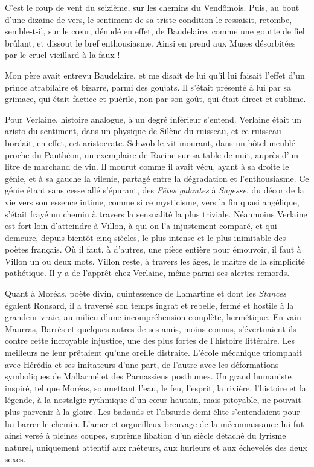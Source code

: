 \documentclass[french,twoside]{book} %
\begin{document}
\noindent C’est le coup de vent du seizième, sur les chemins du Vendômois. Puis, au bout d’une dizaine de vers, le sentiment de sa triste condition le ressaisit, retombe, semble-t-il, sur le cœur, dénudé en effet, de Baudelaire, comme une goutte de fiel brûlant, et dissout le bref enthousiasme. Ainsi en prend aux Muses désorbitées par le cruel vieillard à la faux !\par
Mon père avait entrevu Baudelaire, et me disait de lui qu’il lui faisait l’effet d’un prince atrabilaire et bizarre, parmi des goujats. Il s’était présenté à lui par sa grimace, qui était factice et puérile, non par son goût, qui était direct et sublime.\par
Pour Verlaine, histoire analogue, à un degré inférieur s’entend. Verlaine était un aristo du sentiment, dans un physique de Silène du ruisseau, et ce ruisseau bordait, en effet, cet aristocrate. Schwob le vit mourant, dans un hôtel meublé proche du Panthéon, un exemplaire de Racine sur sa table de nuit, auprès d’un litre de marchand de vin. Il mourut comme il avait vécu, ayant à sa droite le génie, et à sa gauche la vilenie, partagé entre la dégradation et l’enthousiasme. Ce génie étant sans cesse allé s’épurant, des {\itshape Fêtes galantes} à {\itshape Sagesse}, du décor de la vie vers son essence intime, comme si ce mysticisme, vers la fin quasi angélique, s’était frayé un chemin à travers la sensualité la plus triviale. Néanmoins Verlaine est fort loin d’atteindre à Villon, à qui on l’a injustement comparé, et qui demeure, depuis bientôt cinq siècles, le plus intense et le plus inimitable des poètes français. Où il faut, à d’autres, une pièce entière pour émouvoir, il faut à Villon un ou deux mots. Villon reste, à travers les âges, le maître de la simplicité pathétique. Il y a de l’apprêt chez Verlaine, même parmi ses alertes remords.\par
Quant à Moréas, poète divin, quintessence de Lamartine et dont les {\itshape Stances} égalent Ronsard, il a traversé son temps ingrat et rebelle, fermé et hostile à la grandeur vraie, au milieu d’une incompréhension complète, hermétique. En vain Maurras, Barrès et quelques autres de ses amis, moins connus, s’évertuaient-ils contre cette incroyable injustice, une des plus fortes de l’histoire littéraire. Les meilleurs ne leur prêtaient qu’une oreille distraite. L’école mécanique triomphait avec Hérédia et ses imitateurs d’une part, de l’autre avec les déformations symboliques de Mallarmé et des Parnassiens posthumes. Un grand humaniste inspiré, tel que Moréas, soumettant l’eau, le feu, l’esprit, la rivière, l’histoire et la légende, à la nostalgie rythmique d’un cœur hautain, mais pitoyable, ne pouvait plus parvenir à la gloire. Les badauds et l’absurde demi-élite s’entendaient pour lui barrer le chemin. L’amer et orgueilleux breuvage de la méconnaissance lui fut ainsi versé à pleines coupes, suprême libation d’un siècle détaché du lyrisme naturel, uniquement attentif aux rhéteurs, aux hurleurs et aux échevelés des deux sexes.\par
\end{document}
